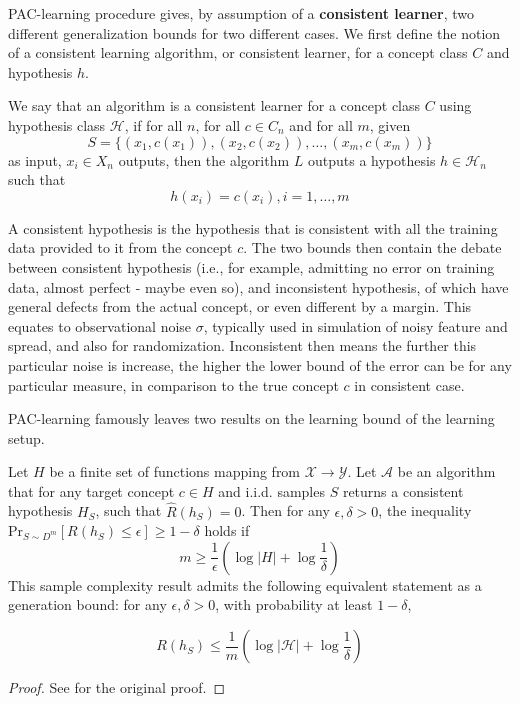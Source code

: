\documentclass[10pt]{article} %
\begin{document}
PAC-learning procedure gives, by assumption of a \textbf{consistent learner}, two different generalization bounds for two different cases. We first define the notion of a consistent learning algorithm, or consistent learner, for a concept class $C$ and hypothesis $h$. 
{
    \small
    \begin{definition}
    We say that an algorithm is a consistent learner for a concept class $C$ using hypothesis class $\mathcal{H}$, if for all $n$, for all $c\in C_n$ and for all $m$, given 
    \begin{equation*}
        S = \{ (x_1, c(x_1)) , (x_2, c(x_2)) ,\dots, (x_m, c(x_m))  \} 
    \end{equation*}
    as input, $x_i \in X_n$ outputs, then the algorithm $L$ outputs a hypothesis $h\in \mathcal{H}_n$ such that $$h(x_i) = c(x_i) , i = 1,\dots,m$$ 
    \end{definition}
}
A consistent hypothesis is the hypothesis that is consistent with all the training data provided to it from the concept $c$. The two bounds then contain the debate between consistent hypothesis (i.e., for example, admitting no error on training data, almost perfect - maybe even so), and inconsistent hypothesis, of which have general defects from the actual concept, or even different by a margin. This equates to observational noise $\sigma$, typically used in simulation of noisy feature and spread, and also for randomization. Inconsistent then means the further this particular noise is increase, the higher the lower bound of the error can be for any particular measure, in comparison to the true concept $c$ in consistent case. 

PAC-learning famously leaves two results on the learning bound of the learning setup. 
\begin{theorem}\label{thm:PAC_consistent}
    Let $H$ be a finite set of functions mapping from $\mathcal{X}\to \mathcal{Y}$. Let $\mathcal{A}$ be an algorithm that for any target concept $c\in H$ and i.i.d. samples $S$ returns a consistent hypothesis $H_{S}$, such that $\hat{R}(h_{S}) = 0$. Then for any  $\epsilon,\delta>0$, the inequality $\mathrm{Pr}_{S\sim D^{m}}[R(h_{S})\leq \epsilon]\geq 1-\delta$ holds if $$m\geq \frac{1}{\epsilon}\left( \log{\lvert H \rvert }+\log{\frac{1}{\delta}} \right)$$
This sample complexity result admits the following equivalent statement as a generation bound: for any $\epsilon,\delta>0$, with probability at least $1-\delta$, 

\begin{equation}
    R(h_S) \leq \frac{1}{m} \left( \log{|\mathcal{H}|} + \log{\frac{1}{\delta}} \right)
\end{equation}
\end{theorem}
\begin{proof}
    See \cite{10.5555/2371238} for the original proof.
\end{proof}
\end{document}
